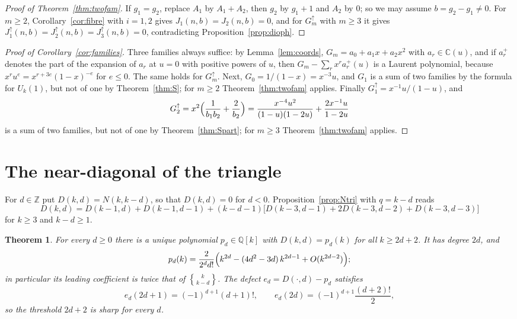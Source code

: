 \documentclass[11pt]{amsart}
\newtheorem{theorem}{Theorem}[section]
\theoremstyle{definition}
\newcommand{\stirling}[2]{\genfrac{\{}{\}}{0pt}{}{#1}{#2}}
\newcommand{\C}{\mathbb{C}}
\newcommand{\Q}{\mathbb{Q}}
\newcommand{\Z}{\mathbb{Z}}
\begin{document}
\begin{proof}[Proof of Theorem~\ref{thm:twofam}]
If $g_1=g_2$, replace $A_1$ by $A_1+A_2$, then $g_2$ by $g_1+1$ and $A_2$ by $0$; so we may assume $b=g_2-g_1\ne0$. For $m\ge2$, Corollary~\ref{cor:fibre} with $i=1,2$ gives $J_1(n,b)=J_2(n,b)=0$, and for $G^{\uparrow}_m$ with $m\ge3$ it gives $J^{\uparrow}_1(n,b)=J^{\uparrow}_2(n,b)=J^{\uparrow}_3(n,b)=0$, contradicting Proposition~\ref{prop:dioph}.
\end{proof}

\begin{proof}[Proof of Corollary~\ref{cor:families}]
Three families always suffice: by Lemma~\ref{lem:coords}, $G_m=a_0+a_1x+a_2x^2$ with $a_r\in\C(u)$, and if $a_r^{+}$ denotes the part of the expansion of $a_r$ at $u=0$ with positive powers of $u$, then $G_m-\sum_rx^ra_r^{+}(u)$ is a Laurent polynomial, because $x^ru^e=x^{r+3e}(1-x)^{-e}$ for $e\le0$. The same holds for $G^{\uparrow}_m$. Next, $G_0=1/(1-x)=x^{-3}u$, and $G_1$ is a sum of two families by the formula for $U_k(1)$, but not of one by Theorem~\ref{thm:S}; for $m\ge2$ Theorem~\ref{thm:twofam} applies. Finally $G^{\uparrow}_1=x^{-1}u/(1-u)$, and
\[
  G^{\uparrow}_2=x^2\Bigl(\frac{1}{b_1b_2}+\frac{2}{b_2}\Bigr)=\frac{x^{-4}u^2}{(1-u)(1-2u)}+\frac{2x^{-1}u}{1-2u}
\]
is a sum of two families, but not of one by Theorem~\ref{thm:Spart}; for $m\ge3$ Theorem~\ref{thm:twofam} applies.
\end{proof}

\section{The near-diagonal of the triangle}\label{sec:neardiag}

For $d\in\Z$ put $D(k,d)=N(k,k-d)$, so that $D(k,d)=0$ for $d<0$. Proposition~\ref{prop:Ntri} with $q=k-d$ reads
\begin{equation}\label{eq:Drec}
  D(k,d)=D(k-1,d)+D(k-1,d-1)+(k-d-1)\bigl[D(k-3,d-1)+2D(k-3,d-2)+D(k-3,d-3)\bigr]
\end{equation}
for $k\ge3$ and $k-d\ge1$.

\begin{theorem}\label{thm:neardiag}
For every $d\ge0$ there is a unique polynomial $p_d\in\Q[k]$ with $D(k,d)=p_d(k)$ for all $k\ge2d+2$. It has degree $2d$, and
\[
  p_d(k)=\frac{2}{2^dd!}\Bigl(k^{2d}-(4d^2-3d)\,k^{2d-1}+O(k^{2d-2})\Bigr);
\]
in particular its leading coefficient is twice that of $\stirling{k}{k-d}$. The defect $e_d=D(\cdot,d)-p_d$ satisfies
\[
  e_d(2d+1)=(-1)^{d+1}(d+1)!,\qquad e_d(2d)=(-1)^{d+1}\frac{(d+2)!}{2},
\]
so the threshold $2d+2$ is sharp for every $d$.
\end{theorem}
\end{document}
